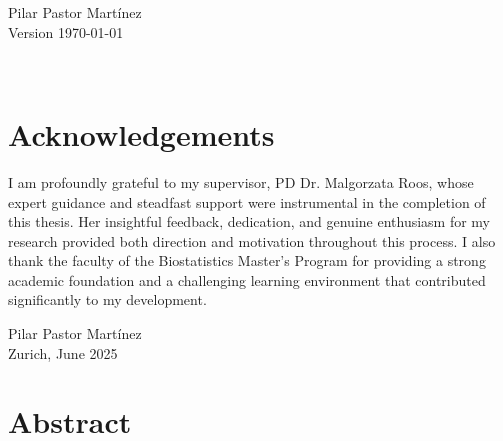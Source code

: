 \documentclass[11pt,a4paper,twoside]{book}
\begin{document}


\graphicspath{{./figure/}}
\setcounter{tocdepth}{1}

\thispagestyle{empty}
\begin{center}
  \vspace*{6cm}{\bfseries\Huge
  Frequentists and Bayesian methods to incorporate 
	recruitment rate stochasticity 
	at the design stage of a clinical trial
  }
  \vfill
  \rm

  \LARGE
  Pilar Pastor Mart\'inez \\[12mm]
  
  \normalsize
  Version \today
\end{center}
\newpage
\thispagestyle{empty}~
\newpage
{}

\chapter*{Acknowledgements}
\thispagestyle{plain}

I am profoundly grateful to my supervisor, PD Dr. Malgorzata Roos, whose expert guidance and steadfast support were instrumental in the completion of this thesis. Her insightful feedback, dedication, and genuine enthusiasm for my research provided both direction and motivation throughout this process. I also thank the faculty of the Biostatistics Master's Program for providing a strong academic foundation and a challenging learning environment that contributed significantly to my development.

\bigskip

\begin{flushright}
  Pilar Pastor Mart\'inez\\
  Zurich, June 2025
\end{flushright}



\thispagestyle{plain}
\tableofcontents
{}


\cleardoublepage
{}

\chapter*{Abstract}
\thispagestyle{plain}
\end{document}
